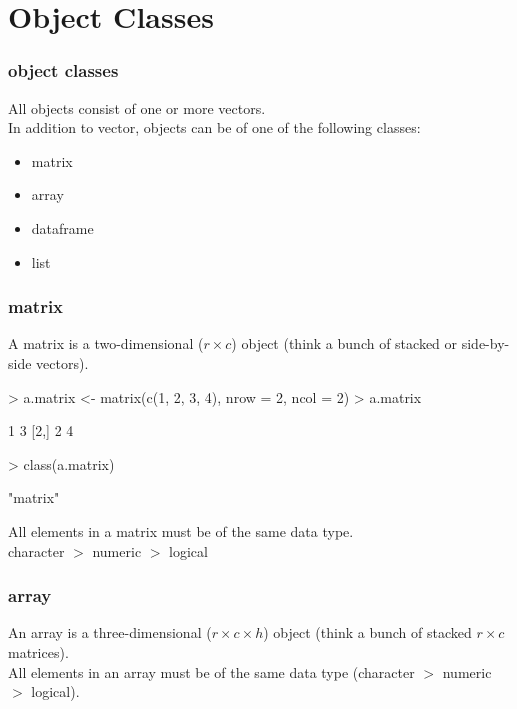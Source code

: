 \documentclass[handout]{beamer}
\newcommand{\red}{\color{red}}
\newcommand{\black}{\color{black}}
\begin{document}
\section{Object Classes}
\begin{frame}
\frametitle{object classes}
All objects consist of one or more vectors. \\
\pause
\bigskip
In addition to vector, objects can be of one of the following classes:
\pause
\begin{itemize}
\item matrix
\item array
\item dataframe
\item list
\end{itemize}
\end{frame}

\begin{frame}[fragile]
\frametitle{matrix}
A matrix is a two-dimensional ($r \times c$) object (think a bunch of stacked or side-by-side vectors).
\pause
\bigskip
\red
\begin{Schunk}
\begin{Sinput}
> a.matrix <- matrix(c(1, 2, 3, 4), nrow = 2, ncol = 2)
> a.matrix
\end{Sinput}
\begin{Soutput}
     [,1] [,2]
[1,]    1    3
[2,]    2    4
\end{Soutput}
\end{Schunk}
\pause
\begin{Schunk}
\begin{Sinput}
> class(a.matrix)
\end{Sinput}
\begin{Soutput}
[1] "matrix"
\end{Soutput}
\end{Schunk}
\black
\pause
\bigskip
\begin{center}
 All elements in a matrix must be of the same data type. \\
 \pause
 character $>$ numeric $>$ logical
 \end{center}
\end{frame}

\begin{frame}[fragile]
\frametitle{array}
An array is a three-dimensional ($r \times c \times h$) object (think a bunch of stacked $r \times c$ matrices). \\
\pause
\bigskip
All elements in an array must be of the same data type (character $>$ numeric $>$ logical).
\end{frame}
\end{document}
